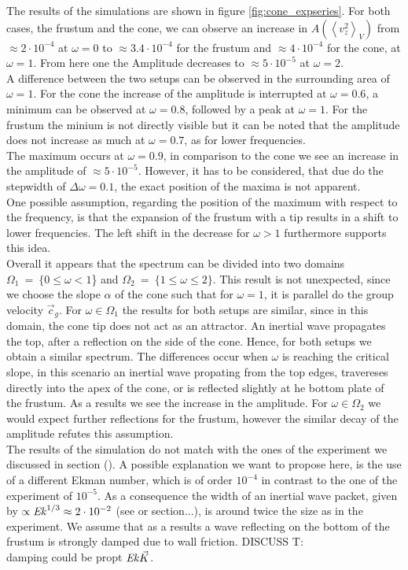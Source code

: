 The results of the simulations are shown in figure \ref{fig:cone_expseries}.
For both cases, the frustum and the cone, we can observe an increase in $A\left(\left<v^2_z\right>_V\right)$
from $\approx 2\cdot10^{-4}$ at $\omega=0$ to  $\approx 3.4\cdot10^{-4}$ for the frustum and $\approx 4\cdot10^{-4}$ for the cone,  at $\omega=1$.
From here one the Amplitude decreases to $\approx 5\cdot10^{-5}$ at $\omega=2$.\\
A difference between the two setups can be observed in the surrounding area of $\omega=1$.
For the cone the increase of the amplitude is interrupted at $\omega=0.6$, a minimum can be observed at $\omega=0.8$, followed by
a peak at $\omega=1$. For the frustum the minium is not directly visible but it can be noted that the
amplitude does not increase as much at $\omega=0.7$, as for lower frequencies.\\
The maximum occurs at $\omega=0.9$, in comparison to the cone we see an increase in the amplitude of $\approx 5\cdot10^{-5}$.
However, it has to be considered, that due do the stepwidth of $\Delta \omega = 0.1$, the exact position of the maxima is
not apparent.\\
One possible assumption, regarding the position of the maximum with respect to the frequency, is that
the expansion of the frustum with a tip  results in a shift to lower frequencies.
The left shift in the decrease for $\omega > 1$ furthermore supports this idea.\\
Overall it appears that the spectrum can be divided into two domains $\Omega_1~=~\{0\leq\omega<1$\} and $\Omega_2~=~\{1\leq\omega\leq2\}$.
This result is not unexpected, since we choose the slope $\alpha$ of the cone such that for $\omega=1$, it is parallel
do the group velocity $\vec{c}_{g}$.
For $\omega\in\Omega_1$ the results for both setups are similar, since in this domain, the cone tip does not act as an attractor.
An inertial wave propagates the top, after a reflection on the side of the cone.
Hence, for both setups we obtain a similar spectrum.
The differences occur when $\omega$ is reaching the critical slope, in this scenario an inertial wave propating from the
top edges, travereses directly into the apex of the cone, or is reflected slightly at he bottom plate of the frustum.
As a results we see the increase in the amplitude.
For $\omega\in \Omega_2$ we would expect further reflections for the frustum, however the similar
decay of the amplitude refutes this assumption.\\
The results of the simulation do not match with the ones of the experiment we discussed in section ().
A possible explanation we want to propose here, is the use of a different Ekman number, which is of order $10^{-4}$ in contrast
to the one of the experiment of $10^{-5}$.
As a consequence the width of an inertial wave packet, given by $\propto \mbox{\textit{Ek}}^{1/3} \approx 2\cdot10^{-2}$ (see \citep{} or section...),
is around twice the size as in the experiment. We assume that as a results a wave reflecting on the bottom of the frustum
is strongly damped due to wall friction.
DISCUSS T:\\
damping  could be propt $\mbox{\textit{Ek}} \vec{K}$.

